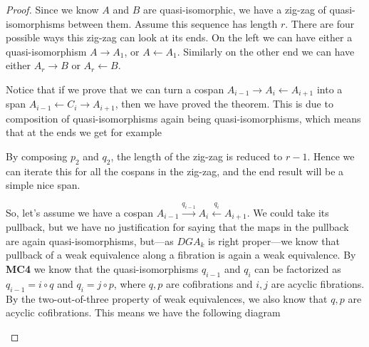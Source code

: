 \begin{proof}
Since we know $A$ and $B$ are quasi-isomorphic, we have a zig-zag of quasi-isomorphisms between them. Assume this sequence has length $r$. There are four possible ways this zig-zag can look at its ends. On the left we can have either a quasi-isomorphism $A\longrightarrow A_1$, or $A\longleftarrow A_1$. Similarly on the other end we can have either $A_r\longrightarrow B$ or $A_r\longleftarrow B$. 

Notice that if we prove that we can turn a cospan $A_{i-1}\longrightarrow A_i\longleftarrow A_{i+1}$ into a span $A_{i-1}\longleftarrow C_i \longrightarrow A_{i+1}$, then we have proved the theorem. This is due to composition of quasi-isomorphisms again being quasi-isomorphisms, which means that at the ends we get for example
\begin{center}
\end{center}
By composing $p_2$ and $q_2$, the length of the zig-zag is reduced to $r-1$. Hence we can iterate this for all the cospans in the zig-zag, and the end result will be a simple nice span. 

So, let's assume we have a cospan $A_{i-1}\overset{q_{i-1}}\longrightarrow A_i\overset{q_i}\longleftarrow A_{i+1}$. We could take its pullback, but we have no justification for saying that the maps in the pullback are again quasi-isomorphisms, but---as $DGA_k$ is right proper---we know that pullback of a weak equivalence along a fibration is again a weak equivalence. By \textbf{MC4} we know that the quasi-isomorphisms $q_{i-1}$ and $q_i$ can be factorized as $q_{i-1} = i \circ q$ and $q_i = j\circ p$, where $q, p$ are cofibrations and $i, j$ are acyclic fibrations. By the two-out-of-three property of weak equivalences, we also know that $q, p$ are acyclic cofibrations. This means we have the following diagram
\begin{center}
\end{center}
\end{proof}
